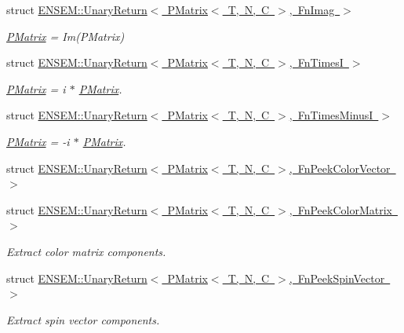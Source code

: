 \begin{DoxyCompactItemize}
struct \mbox{\hyperlink{structENSEM_1_1UnaryReturn_3_01PMatrix_3_01T_00_01N_00_01C_01_4_00_01FnImag_01_4}{E\+N\+S\+E\+M\+::\+Unary\+Return$<$ P\+Matrix$<$ T, N, C $>$, Fn\+Imag $>$}}
\begin{DoxyCompactList}\small\item\em \mbox{\hyperlink{classENSEM_1_1PMatrix}{P\+Matrix}} = Im(\+P\+Matrix) \end{DoxyCompactList}\item 
struct \mbox{\hyperlink{structENSEM_1_1UnaryReturn_3_01PMatrix_3_01T_00_01N_00_01C_01_4_00_01FnTimesI_01_4}{E\+N\+S\+E\+M\+::\+Unary\+Return$<$ P\+Matrix$<$ T, N, C $>$, Fn\+Times\+I $>$}}
\begin{DoxyCompactList}\small\item\em \mbox{\hyperlink{classENSEM_1_1PMatrix}{P\+Matrix}} = i $\ast$ \mbox{\hyperlink{classENSEM_1_1PMatrix}{P\+Matrix}}. \end{DoxyCompactList}\item 
struct \mbox{\hyperlink{structENSEM_1_1UnaryReturn_3_01PMatrix_3_01T_00_01N_00_01C_01_4_00_01FnTimesMinusI_01_4}{E\+N\+S\+E\+M\+::\+Unary\+Return$<$ P\+Matrix$<$ T, N, C $>$, Fn\+Times\+Minus\+I $>$}}
\begin{DoxyCompactList}\small\item\em \mbox{\hyperlink{classENSEM_1_1PMatrix}{P\+Matrix}} = -\/i $\ast$ \mbox{\hyperlink{classENSEM_1_1PMatrix}{P\+Matrix}}. \end{DoxyCompactList}\item 
struct \mbox{\hyperlink{structENSEM_1_1UnaryReturn_3_01PMatrix_3_01T_00_01N_00_01C_01_4_00_01FnPeekColorVector_01_4}{E\+N\+S\+E\+M\+::\+Unary\+Return$<$ P\+Matrix$<$ T, N, C $>$, Fn\+Peek\+Color\+Vector $>$}}
\item 
struct \mbox{\hyperlink{structENSEM_1_1UnaryReturn_3_01PMatrix_3_01T_00_01N_00_01C_01_4_00_01FnPeekColorMatrix_01_4}{E\+N\+S\+E\+M\+::\+Unary\+Return$<$ P\+Matrix$<$ T, N, C $>$, Fn\+Peek\+Color\+Matrix $>$}}
\begin{DoxyCompactList}\small\item\em Extract color matrix components. \end{DoxyCompactList}\item 
struct \mbox{\hyperlink{structENSEM_1_1UnaryReturn_3_01PMatrix_3_01T_00_01N_00_01C_01_4_00_01FnPeekSpinVector_01_4}{E\+N\+S\+E\+M\+::\+Unary\+Return$<$ P\+Matrix$<$ T, N, C $>$, Fn\+Peek\+Spin\+Vector $>$}}
\begin{DoxyCompactList}\small\item\em Extract spin vector components. \end{DoxyCompactList}\item 

\end{DoxyCompactItemize}
